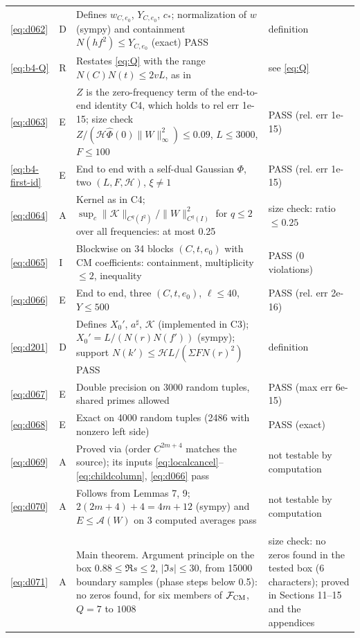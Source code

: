 \documentclass[11pt]{article}
\numberwithin{equation}{section}
\begin{document}
\begin{longtable}{@{}>{\raggedright\arraybackslash}p{1.2cm}>{\centering\arraybackslash}p{0.7cm}>{\raggedright\arraybackslash}p{9.05cm}>{\raggedright\arraybackslash}p{4.3cm}@{}}
\eqref{eq:d062} & D & Defines $w_{C,e_0}$, $Y_{C,e_0}$, $c_*$; normalization of $w$ (sympy) and containment $N(hf^2)\le Y_{C,e_0}$ (exact) PASS & definition\\
\eqref{eq:b4-Q} & R & Restates \eqref{eq:Q} with the range $N(C)N(t)\le2vL$, as in~\cite{OAI1112} & see \eqref{eq:Q}\\
\eqref{eq:d063} & E & $Z$ is the zero-frequency term of the end-to-end identity C4, which holds to rel err 1e-15; size check $Z/(\mathcal H\widehat\Phi(0)\|W\|_\infty^2)\le0.09$, $L\le3000$, $F\le100$ & PASS (rel. err 1e-15)\\
\eqref{eq:b4-first-id} & E & End to end with a self-dual Gaussian $\Phi$, two $(L,F,\mathcal H)$, $\xi\ne1$ & PASS (rel. err 1e-15)\\
\eqref{eq:d064} & A & Kernel as in C4; $\sup_c\|\mathcal K\|_{C^q(I^2)}/\|W\|_{C^q(I)}^2$ for $q\le2$ over all frequencies: at most 0.25 & size check: ratio $\le0.25$\\
\eqref{eq:d065} & I & Blockwise on 34 blocks $(C,t,e_0)$ with CM coefficients: containment, multiplicity $\le2$, inequality & PASS (0 violations)\\
\eqref{eq:d066} & E & End to end, three $(C,t,e_0)$, $\ell\le40$, $Y\le500$ & PASS (rel. err 2e-16)\\
\eqref{eq:d201} & D & Defines $X_0'$, $a^\sharp$, $\mathcal K$ (implemented in C3); $X_0'=L/(N(r)N(f'))$ (sympy); support $N(k')\le\mathcal HL/(\Sigma FN(r)^2)$ PASS & definition\\
\eqref{eq:d067} & E & Double precision on 3000 random tuples, shared primes allowed & PASS (max err 6e-15)\\
\eqref{eq:d068} & E & Exact on 4000 random tuples (2486 with nonzero left side) & PASS (exact)\\
\eqref{eq:d069} & A & Proved via \cite[Lemma~7.3]{OAI1112} (order $C^{2m+4}$ matches the source); its inputs \eqref{eq:localcancel}--\eqref{eq:childcolumn}, \eqref{eq:d066} pass & not testable by computation\\
\eqref{eq:d070} & A & Follows from Lemmas 7, 9; $2(2m+4)+4=4m+12$ (sympy) and $E\le\mathcal A(W)$ on 3 computed averages pass & not testable by computation\\
\multicolumn{4}{@{}l}{\emph{Section~11}}\\
\eqref{eq:d071} & A & Main theorem. Argument principle on the box $0.88\le\Re s\le2$, $|\Im s|\le30$, from 15000 boundary samples (phase steps below 0.5): no zeros found, for six members of $\mathcal F_{\rm CM}$, $Q=7$ to $1008$ & size check: no zeros found in the tested box (6 characters); proved in Sections 11--15 and the appendices\\

\end{longtable}
\end{document}
